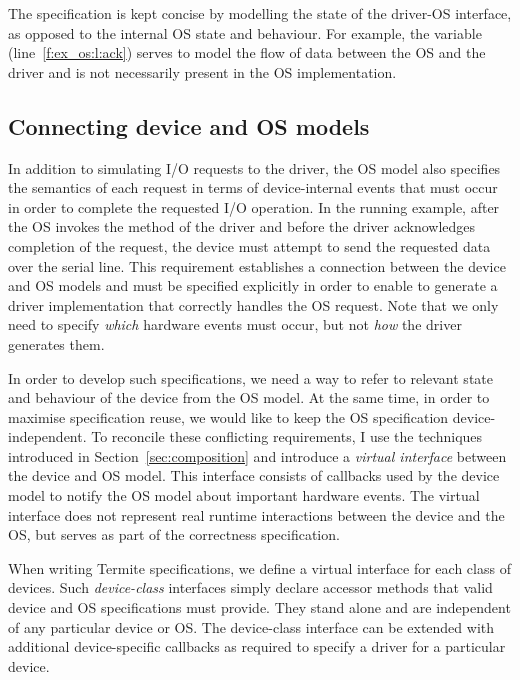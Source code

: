 The specification is kept concise by modelling the state of the driver-OS interface, as opposed to the internal OS state and behaviour.  For example, the  variable (line~\ref{f:ex_os:l:ack}) serves to model the flow of data between the OS and the driver and is not necessarily present in the OS implementation.

\subsection{Connecting device and OS models}
\label{s:virt}

In addition to simulating I/O requests to the driver, the OS model also specifies the semantics of each request in terms of device-internal events that must occur in order to complete the requested I/O operation.  In the running example, after the OS invokes the  method of the driver and before the driver acknowledges completion of the request, the device must attempt to send the requested data over the serial line.  This requirement establishes a connection between the device and OS models and must be specified explicitly in order to enable \termite to generate a driver implementation that correctly handles the OS request.  Note that we only need to specify \emph{which} hardware events must occur, but not \emph{how} the driver generates them.

In order to develop such specifications, we need a way to refer to relevant state and behaviour of the device from the OS model.  At the same time, in order to maximise specification reuse, we would like to keep the OS specification device-independent.  To reconcile these conflicting requirements, I use the techniques introduced in Section~\ref{sec:composition} and introduce a \emph{virtual interface} between the device and OS model.  This interface consists of callbacks used by the device model to notify the OS model about important hardware events.  The virtual interface does not represent real runtime interactions between the device and the OS, but serves as part of the correctness specification. 

When writing Termite specifications, we define a virtual interface for each class of devices.  Such \emph{device-class} interfaces simply declare accessor methods that valid device and OS specifications must provide. They stand alone and are independent of any particular device or OS. The device-class interface can be extended with additional device-specific callbacks as required to specify a driver for a particular device. 

